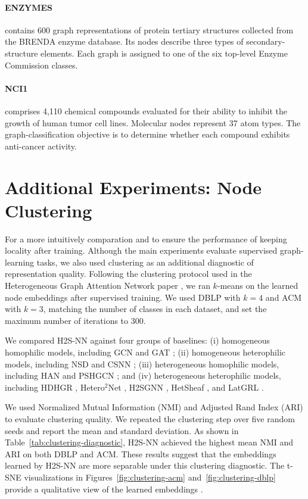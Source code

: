 \documentclass[sigconf,anonymous,review]{acmart}
\newcommand{\method}{\textsc{H2S-NN}}
\begin{document}
\paragraph{ENZYMES}
contains 600 graph representations of protein tertiary structures
collected from the BRENDA enzyme database. Its nodes describe three types of
secondary-structure elements. Each graph is assigned to one of the six
top-level Enzyme Commission classes.
\paragraph{NCI1}
comprises 4,110 chemical compounds evaluated for their ability to inhibit
the growth of human tumor cell lines. Molecular nodes represent 37 atom types.
The graph-classification objective is to determine whether each compound
exhibits anti-cancer activity.




\section{Additional Experiments: Node Clustering}
\label{sec:additional-clustering}

For a more intuitively comparation and to ensure the performance of keeping locality after training. Although the main experiments evaluate supervised graph-learning tasks, we also used clustering as an additional diagnostic of representation quality. Following the clustering protocol used in the Heterogeneous Graph Attention Network paper \cite{wang2019han}, we ran $k$-means on the learned node embeddings after supervised training. We used DBLP with $k=4$ and ACM with $k=3$, matching the number of classes in each dataset, and set the maximum number of iterations to 300.

We compared \method{} against four groups of baselines: (i) homogeneous homophilic models, including GCN \cite{kipf2017gcn} and GAT \cite{velickovic2018gat}; (ii) homogeneous heterophilic models, including NSD \cite{bodnar2022neural} and CSNN \cite{ribeiro2026cooperative}; (iii) heterogeneous homophilic models, including HAN \cite{wang2019han} and PSHGCN \cite{he2024spectral}; and (iv) heterogeneous heterophilic models, including HDHGR \cite{guo2023homophily}, Hetero$^2$Net \cite{li2025hetero2net}, H2SGNN \cite{lu2026addressing}, HetSheaf \cite{braithwaite2024heterogeneous}, and LatGRL \cite{shen2025heterophily}.

We used Normalized Mutual Information (NMI) and Adjusted Rand Index (ARI) to evaluate clustering quality. We repeated the clustering step over five random seeds and report the mean and standard deviation. As shown in Table~\ref{tab:clustering-diagnostic}, \method{} achieved the highest mean NMI and ARI on both DBLP and ACM. These results suggest that the embeddings learned by \method{} are more separable under this clustering diagnostic. The t-SNE visualizations in Figures~\ref{fig:clustering-acm} and~\ref{fig:clustering-dblp} provide a qualitative view of the learned embeddings \cite{van2008tsne}.
\end{document}
